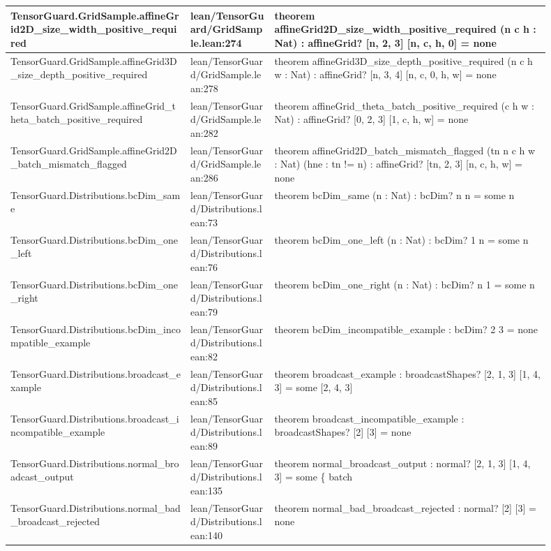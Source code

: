 \documentclass[10pt]{article}
\begin{document}
\begin{longtable}{|p{0.30\linewidth}|p{0.14\linewidth}|p{0.46\linewidth}|}
\hline
TensorGuard.GridSample.affineGrid2D\_size\_width\_positive\_required & lean/TensorGuard/GridSample.lean:274 & theorem affineGrid2D\_size\_width\_positive\_required (n c h : Nat) : affineGrid? [n, 2, 3] [n, c, h, 0] = none \\
\hline
TensorGuard.GridSample.affineGrid3D\_size\_depth\_positive\_required & lean/TensorGuard/GridSample.lean:278 & theorem affineGrid3D\_size\_depth\_positive\_required (n c h w : Nat) : affineGrid? [n, 3, 4] [n, c, 0, h, w] = none \\
\hline
TensorGuard.GridSample.affineGrid\_theta\_batch\_positive\_required & lean/TensorGuard/GridSample.lean:282 & theorem affineGrid\_theta\_batch\_positive\_required (c h w : Nat) : affineGrid? [0, 2, 3] [1, c, h, w] = none \\
\hline
TensorGuard.GridSample.affineGrid2D\_batch\_mismatch\_flagged & lean/TensorGuard/GridSample.lean:286 & theorem affineGrid2D\_batch\_mismatch\_flagged (tn n c h w : Nat) (hne : tn != n) : affineGrid? [tn, 2, 3] [n, c, h, w] = none \\
\hline
TensorGuard.Distributions.bcDim\_same & lean/TensorGuard/Distributions.lean:73 & theorem bcDim\_same (n : Nat) : bcDim? n n = some n \\
\hline
TensorGuard.Distributions.bcDim\_one\_left & lean/TensorGuard/Distributions.lean:76 & theorem bcDim\_one\_left (n : Nat) : bcDim? 1 n = some n \\
\hline
TensorGuard.Distributions.bcDim\_one\_right & lean/TensorGuard/Distributions.lean:79 & theorem bcDim\_one\_right (n : Nat) : bcDim? n 1 = some n \\
\hline
TensorGuard.Distributions.bcDim\_incompatible\_example & lean/TensorGuard/Distributions.lean:82 & theorem bcDim\_incompatible\_example : bcDim? 2 3 = none \\
\hline
TensorGuard.Distributions.broadcast\_example & lean/TensorGuard/Distributions.lean:85 & theorem broadcast\_example : broadcastShapes? [2, 1, 3] [1, 4, 3] = some [2, 4, 3] \\
\hline
TensorGuard.Distributions.broadcast\_incompatible\_example & lean/TensorGuard/Distributions.lean:89 & theorem broadcast\_incompatible\_example : broadcastShapes? [2] [3] = none \\
\hline
TensorGuard.Distributions.normal\_broadcast\_output & lean/TensorGuard/Distributions.lean:135 & theorem normal\_broadcast\_output : normal? [2, 1, 3] [1, 4, 3] = some \{ batch \\
\hline
TensorGuard.Distributions.normal\_bad\_broadcast\_rejected & lean/TensorGuard/Distributions.lean:140 & theorem normal\_bad\_broadcast\_rejected : normal? [2] [3] = none \\

\end{longtable}
\end{document}
